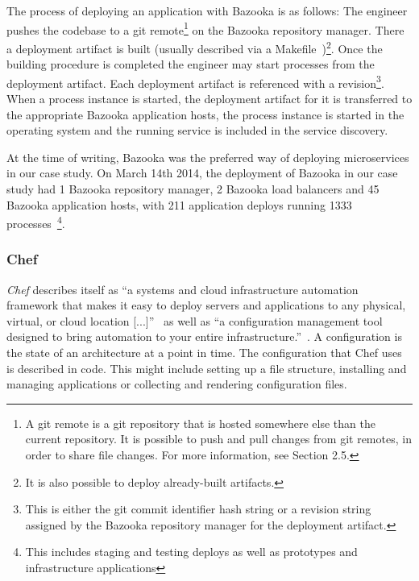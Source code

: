 The process of deploying an application with Bazooka is as follows: The engineer pushes the codebase to a git remote\footnote{A git remote is a git repository that is hosted somewhere else than the current repository. It is possible to push and pull changes from git remotes, in order to share file changes. For more information, see \cite{ProGit} Section 2.5.} on the Bazooka repository manager. There a deployment artifact is built (usually described via a Makefile~\cite{make})\footnote{It is also possible to deploy already-built artifacts.}. Once the building procedure is completed the engineer may start processes from the deployment artifact. Each deployment artifact is referenced with a revision\footnote{This is either the git commit identifier hash string or a revision string assigned by the Bazooka repository manager for the deployment artifact.}. When a process instance is started, the deployment artifact for it is transferred to the appropriate Bazooka application hosts, the process instance is started in the operating system and the running service is included in the service discovery.

At the time of writing, Bazooka was the preferred way of deploying microservices in our case study. On March 14th 2014, the deployment of Bazooka in our case study had 1 Bazooka repository manager, 2 Bazooka load balancers and 45 Bazooka application hosts, with 211 application deploys running 1333 processes~\footnote{This includes staging and testing deploys as well as prototypes and infrastructure applications}.


\subsubsection{Chef}

\emph{Chef} describes itself as ``a systems and cloud infrastructure automation framework that makes it easy to deploy servers and applications to any physical, virtual, or cloud location [...]''~\cite{chefdocs} as well as ``a configuration management tool designed to bring automation to your entire infrastructure.''~\cite{chefgithub}. A configuration is the state of an architecture at a point in time. The configuration that Chef uses is described in code. This might include setting up a file structure, installing and managing applications or collecting and rendering configuration files.

